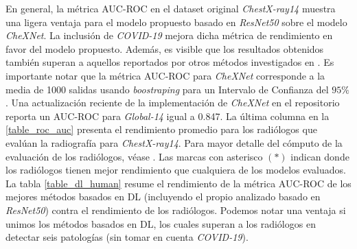 En general, la métrica AUC-ROC en el dataset original \textit{ChestX-ray14} muestra una ligera ventaja
para el modelo propuesto basado en \textit{ResNet50} sobre el modelo \textit{CheXNet}. La inclusión de
\textit{COVID-19} mejora dicha métrica de rendimiento en favor del modelo propuesto. Además, es visible
que los resultados obtenidos también superan a aquellos reportados por otros métodos investigados en
\cite{baltruschat2019comparison}. Es importante notar que la métrica AUC-ROC para \textit{CheXNet}
corresponde a la media de 1000 salidas usando \textit{boostraping} para un Intervalo de Confianza del
$95\%$ \cite{rajpurkar2018deep}. Una actualización reciente de la implementación de \textit{CheXNet} en
el repositorio \cite{chexnet_code} reporta un AUC-ROC para \textit{Global-14} igual a 0.847. La última
columna en la \ref{table_roc_auc} presenta el rendimiento promedio para los radiólogos que evalúan la radiografía
para \textit{ChestX-ray14}. Para mayor detalle del cómputo de la evaluación de los radiólogos, véase
\cite{rajpurkar2018deep}. Las marcas con asterisco $(*)$ indican donde los radiólogos tienen mejor
rendimiento que cualquiera de los modelos evaluados. La tabla \ref{table_dl_human} resume el rendimiento
de la métrica AUC-ROC de los mejores métodos basados en DL (incluyendo el propio analizado basado en
\textit{ResNet50}) contra el rendimiento de los radiólogos. Podemos notar una ventaja si unimos los
métodos basados en DL, los cuales superan a los radiólogos en detectar seis patologías (sin tomar en
cuenta \textit{COVID-19}).


